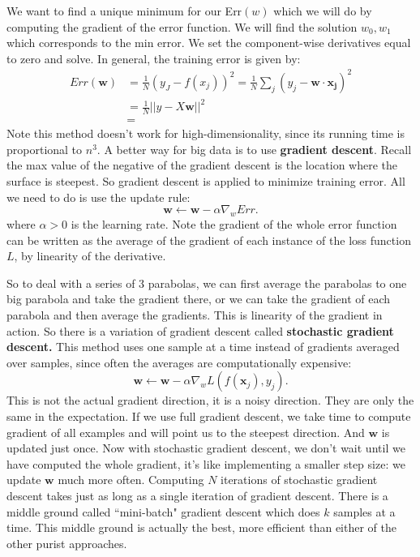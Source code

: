 \documentclass{amsbook}
\theoremstyle{plain}
\numberwithin{section}{chapter}
\numberwithin{equation}{chapter}
\theoremstyle{definition}
\theoremstyle{remark}
\newcommand{\vecc}{\mathbf}
\newcommand{\bee}{\begin{equation}\begin{aligned}}
\newcommand{\eee}{\end{aligned}\end{equation}}
\newcommand{\fracc}{\frac}
\begin{document}
We want to find a unique minimum for our Err$(w)$ which we will do by computing the gradient of the error function. We will find the solution $w_0,w_1$ which corresponds to the min error. We set the component-wise derivatives equal to zero and solve. In general, the training error is given by:
\bee
Err(\vecc{w}) &= \fracc{1}{N}(y_J - f(x_j))^2 = \fracc{1}{N}\sum_j(y_j - \vecc{w}\cdot \vecc{x_j})^2\\
&= \fracc{1}{N}||y - X\vecc{w}||^2\\
&= 
\eee
Note this method doesn't work for high-dimensionality, since its running time is proportional to $n^3$. A better way for big data is to use \textbf{gradient descent}. Recall the max value of the negative of the gradient descent is the location where the surface is steepest. So gradient descent is applied to minimize training error. All we need to do is use the update rule:
$$
\vecc{w} \longleftarrow \vecc{w} - \alpha \nabla_w Err.
$$
where $\alpha >0$ is the learning rate. Note the gradient of the whole error function can be written as the average of the gradient of each instance of the loss function $L$, by linearity of the derivative. 




So to deal with a series of 3 parabolas, we can first average the parabolas to one big parabola and take the gradient there, or we can take the gradient of each parabola and then average the gradients. This is linearity of the gradient in action. So there is a variation of gradient descent called \textbf{stochastic gradient descent. } This method uses one sample at a time instead of gradients averaged over samples, since often the averages are computationally expensive:
$$
\vecc{w} \longleftarrow \vecc{w} - \alpha \nabla_w L(f(\vecc{x}_j),y_j).
$$
This is not the actual gradient direction, it is a noisy direction. They are only the same in the expectation. If we use full gradient descent, we take time to compute gradient of all examples and will point us to the steepest direction. And $\vecc{w}$ is updated just once. Now with stochastic gradient descent, we don't wait until we have computed the whole gradient, it's like implementing a smaller step size: we update $\vecc{w}$ much more often. Computing $N$ iterations of stochastic gradient descent takes just as long as a single iteration of gradient descent. There is a middle ground called ``mini-batch" gradient descent which does $k$ samples at a time. This middle ground is actually the best, more efficient than either of the other purist approaches. 
\end{document}
